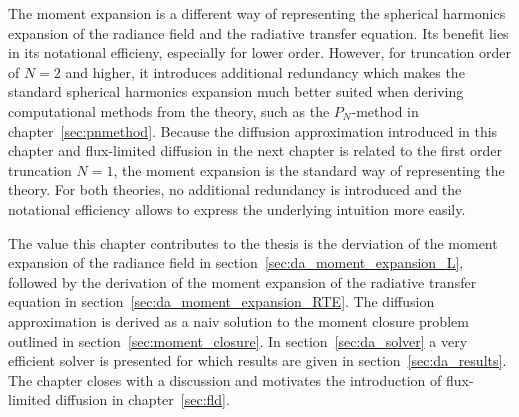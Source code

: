 The moment expansion is a different way of representing the spherical harmonics expansion of the radiance field and the radiative transfer equation. Its benefit lies in its notational efficieny, especially for lower order. However, for truncation order of $N=2$ and higher, it introduces additional redundancy which makes the standard spherical harmonics expansion much better suited when deriving computational methods from the theory, such as the $P_N$-method in chapter~\ref{sec:pnmethod}. Because the diffusion approximation introduced in this chapter and flux-limited diffusion in the next chapter is related to the first order truncation $N=1$, the moment expansion is the standard way of representing the theory. For both theories, no additional redundancy is introduced and the notational efficiency allows to express the underlying intuition more easily.

The value this chapter contributes to the thesis is the derviation of the moment expansion of the radiance field in section~\ref{sec:da_moment_expansion_L}, followed by the derivation of the moment expansion of the radiative transfer equation in section~\ref{sec:da_moment_expansion_RTE}. The diffusion approximation is derived as a naiv solution to the moment closure problem outlined in section~\ref{sec:moment_closure}. In section~\ref{sec:da_solver} a very efficient solver is presented for which results are given in section~\ref{sec:da_results}. The chapter closes with a discussion and motivates the introduction of flux-limited diffusion in chapter~\ref{sec:fld}.










